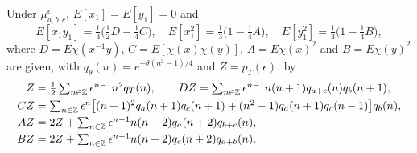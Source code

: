 \begin{lemma}\label{lem:moments}
Under $\mu^\epsilon_{a,b,c}$, $E[x_1]=E[y_1]=0$ and
\[
E[x_1y_1]=\tfrac13\bigl(\tfrac12D-\tfrac14C\bigr),\quad E[x_1^2]=\tfrac13
\bigl(1-\tfrac14A\bigr),\quad E[y_1^2]=\tfrac13\bigl(1-\tfrac14B\bigr),
\]
where $D=E\chi(x^{-1}y)$, $C=E[\chi(x)\chi(y)]$, $A=E\chi(x)^2$ and $B=E\chi(
y)^2$ are given, with $q_\theta(n)=e^{-\theta(n^2-1)/4}$ and $Z=p_T(\epsilon)$, by
\begin{align*}
Z&=\tfrac12\textstyle\sum_{n\in\mathbb{Z}}\epsilon^{n-1}n^2q_T(n),\qquad
DZ=\sum_{n\in\mathbb{Z}}\epsilon^{n-1}n(n+1)q_{a+c}(n)q_b(n+1),\\
CZ&=\textstyle\sum_{n\in\mathbb{Z}}\epsilon^n\bigl[(n+1)^2q_a(n+1)q_c(n+1)+(n^2-1)
q_a(n+1)q_c(n-1)\bigr]q_b(n),\\
AZ&=2Z+\textstyle\sum_{n\in\mathbb{Z}}\epsilon^{n-1}n(n+2)q_a(n+2)q_{b+c}(n),\\
BZ&=2Z+\textstyle\sum_{n\in\mathbb{Z}}\epsilon^{n-1}n(n+2)q_c(n+2)q_{a+b}(n).
\end{align*}
\end{lemma}

